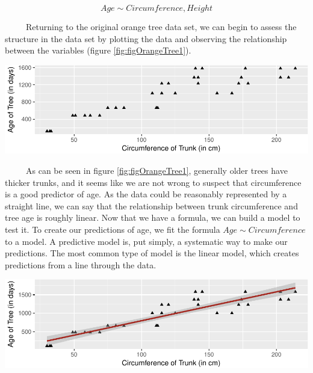 \documentclass[12pt,twoside]{reedthesis}
\let\origfigure\figure
\let\endorigfigure\endfigure
\renewenvironment{figure}[1][2] {
    \expandafter\origfigure\expandafter[H]
} {
    \endorigfigure
}
\begin{document}
  \[Age \sim Circumference, Height\]
  
  ~~~~~Returning to the original orange tree data set, we can begin to
  assess the structure in the data set by plotting the data and observing
  the relationship between the variables (figure
  \ref{fig:figOrangeTree1}).
  
  \begin{figure}[H]
  
  {\centering \includegraphics{Thesis_files/figure-latex/figOrangeTree1-1} 
  
  }
  
  \caption{The relationship between age and circumference of the trunk of orange trees.}\label{fig:figOrangeTree1}
  \end{figure}
  
  ~~~~~As can be seen in figure \ref{fig:figOrangeTree1}, generally older
  trees have thicker trunks, and it seems like we are not wrong to suspect
  that circumference is a good predictor of age. As the data could be
  reasonably represented by a straight line, we can say that the
  relationship between trunk circumference and tree age is roughly linear.
  Now that we have a formula, we can build a model to test it. To create
  our predictions of age, we fit the formula \(Age \sim Circumference\) to
  a model. A predictive model is, put simply, a systematic way to make our
  predictions. The most common type of model is the linear model, which
  creates predictions from a line through the data.
  
  \begin{figure}[htbp]
  \centering
  \includegraphics{Thesis_files/figure-latex/unnamed-chunk-3-1.pdf}
  \caption{\label{fig:unnamed-chunk-3}\label{fig:OrangeLM}A linear model
  representing age \textasciitilde{} trunk circumference in orange trees.
  The shaded area represents a 95\% confidence interval around this line.}
  \end{figure}
  
\end{document}
